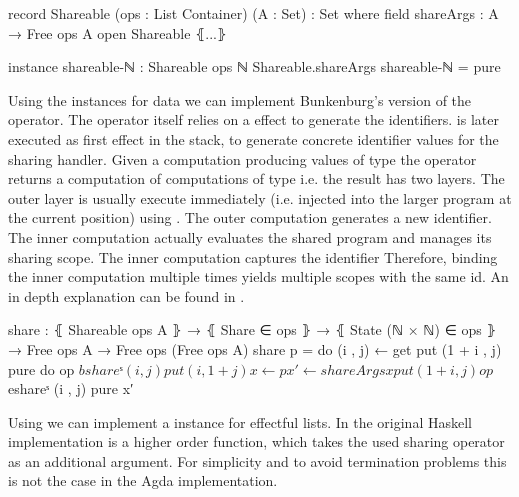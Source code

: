 \begin{code}
record Shareable (ops : List Container) (A : Set) : Set where
  field shareArgs : A → Free ops A
open Shareable ⦃...⦄

instance
  shareable-ℕ : Shareable ops ℕ
  Shareable.shareArgs shareable-ℕ = pure
\end{code}
Using the instances for data we can implement Bunkenburg's version of the
operator.
The operator itself relies on a  effect to generate the
identifiers.
 is later executed as first effect in the stack, to generate
concrete identifier values for the sharing handler.
Given a computation producing values of type  the operator
returns a computation of computations of type  i.e. the result
has two \AgdaSpace{} layers.
The outer layer is usually execute immediately (i.e. injected into the larger
program at the current position) using \AgdaFunction{>>=}.
The outer computation generates a new identifier.
The inner computation actually evaluates the shared program and manages its
sharing scope.
The inner computation captures the identifier
Therefore, binding the inner computation multiple times yields multiple scopes
with the same id.
An in depth explanation can be found in .

\begin{code}
share : ⦃ Shareable ops A ⦄ → ⦃ Share ∈ ops ⦄ → ⦃ State (ℕ × ℕ) ∈ ops ⦄ →
  Free ops A → Free ops (Free ops A)
share p = do (i , j) ← get
             put (1 + i , j)
             pure do op $ bshareˢ (i , j)
                     put (i , 1 + j)
                     x   ← p
                     x′  ← shareArgs x
                     put (1 + i , j)
                     op $ eshareˢ (i , j)
                     pure x′
\end{code}
Using  we can implement a  instance
for effectful lists.
In the original Haskell implementation  is a higher
order function, which takes the used sharing operator as an additional
argument.
For simplicity and to avoid termination problems this is not the case in the
Agda implementation.



